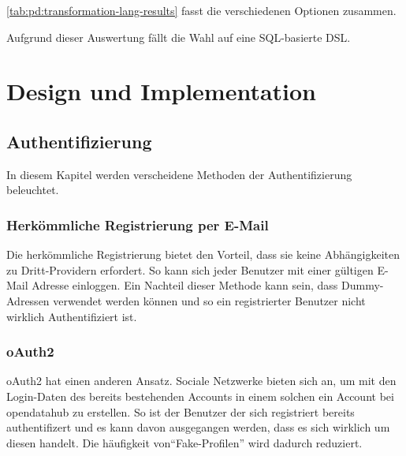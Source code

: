 \cref{tab:pd:transformation-lang-results} fasst die verschiedenen Optionen zusammen.

Aufgrund dieser Auswertung fällt die Wahl auf eine SQL-basierte DSL.

\chapter{Design und Implementation}

\section{Authentifizierung}
In diesem Kapitel werden verscheidene Methoden der Authentifizierung beleuchtet.
\subsection{Herkömmliche Registrierung per E-Mail}
Die herkömmliche Registrierung bietet den Vorteil, dass sie keine Abhängigkeiten zu Dritt-Providern erfordert. So kann sich jeder Benutzer mit einer gültigen E-Mail Adresse einloggen. Ein Nachteil dieser Methode kann sein, dass Dummy-Adressen verwendet werden können und so ein registrierter Benutzer nicht wirklich Authentifiziert ist.
\subsection{oAuth2}
oAuth2 hat einen anderen Ansatz. Sociale Netzwerke bieten sich an, um mit den Login-Daten des bereits bestehenden Accounts in einem solchen ein Account bei opendatahub zu erstellen. So ist der Benutzer der sich registriert bereits authentifizert und es kann davon ausgegangen werden, dass es sich wirklich um diesen handelt. Die häufigkeit von``Fake-Profilen'' wird dadurch reduziert.

